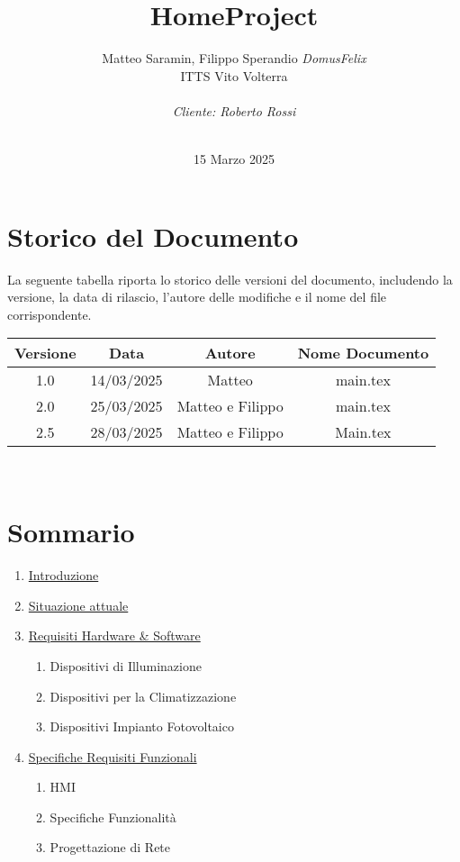 \documentclass[italian, 12pt, a4paper]{article}
\title{\huge{HomeProject}}
\author{Matteo Saramin, Filippo Sperandio \textit{DomusFelix} \\ {\small ITTS Vito Volterra} \\ \\ \emph{Cliente: Roberto Rossi}}
\date{\version\\ 15 Marzo 2025}
\begin{document}
\maketitle %

\section{Storico del Documento}
La seguente tabella riporta lo storico delle versioni del documento, includendo la versione, la data di rilascio, l'autore delle modifiche e il nome del file corrispondente.

\begin{center}
    \renewcommand{\arraystretch}{1.5} %
    \begin{tabular}{|c|c|c|c|}
        \hline
        \rowcolor{violet!30}
        Versione & Data & Autore & Nome Documento \\
        \hline
        1.0 & 14/03/2025 & Matteo & main.tex \\
        \hline
        2.0&25/03/2025&Matteo e Filippo & main.tex \\
        \hline
        2.5&28/03/2025&Matteo e Filippo&Main.tex\\
        \hline
    \end{tabular}\\[4mm]
\end{center}
\vspace{15mm}
\clearpage
\section{Sommario}
\begin{enumerate}
    \item \hyperref[sec:introduzione]{\Large Introduzione}
    \item \hyperref[sec:situazione]{\Large Situazione attuale}
    \item \hyperref[sec:requisiti]{\Large Requisiti Hardware \& Software}
        \begin{enumerate}
            \item Dispositivi di Illuminazione
            \item Dispositivi per la Climatizzazione
            \item Dispositivi Impianto Fotovoltaico
        \end{enumerate}
    \item \hyperref[sec:requisiti2]{\Large Specifiche Requisiti Funzionali}
        \begin{enumerate}
            \item HMI
            \item Specifiche Funzionalità
            \item Progettazione di Rete
        \end{enumerate}
\end{enumerate}
\clearpage
\end{document}
